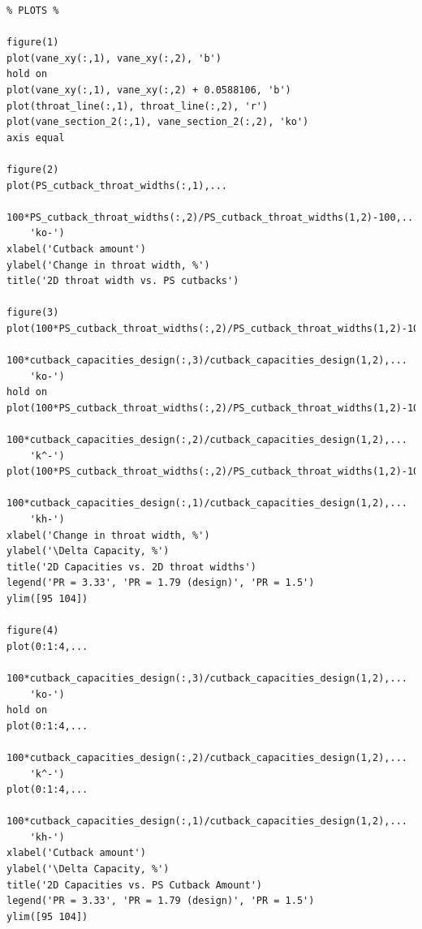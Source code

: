 \documentclass[a4paper, 11pt, oneside]{report}
\begin{document}
\begin{verbatim}
% PLOTS %

figure(1)
plot(vane_xy(:,1), vane_xy(:,2), 'b')
hold on
plot(vane_xy(:,1), vane_xy(:,2) + 0.0588106, 'b')
plot(throat_line(:,1), throat_line(:,2), 'r')
plot(vane_section_2(:,1), vane_section_2(:,2), 'ko')
axis equal

figure(2)
plot(PS_cutback_throat_widths(:,1),...
    100*PS_cutback_throat_widths(:,2)/PS_cutback_throat_widths(1,2)-100,...
    'ko-')
xlabel('Cutback amount')
ylabel('Change in throat width, %')
title('2D throat width vs. PS cutbacks')

figure(3)
plot(100*PS_cutback_throat_widths(:,2)/PS_cutback_throat_widths(1,2)-100,...
    100*cutback_capacities_design(:,3)/cutback_capacities_design(1,2),...
    'ko-')
hold on
plot(100*PS_cutback_throat_widths(:,2)/PS_cutback_throat_widths(1,2)-100,...
    100*cutback_capacities_design(:,2)/cutback_capacities_design(1,2),...
    'k^-')
plot(100*PS_cutback_throat_widths(:,2)/PS_cutback_throat_widths(1,2)-100,...
    100*cutback_capacities_design(:,1)/cutback_capacities_design(1,2),...
    'kh-')
xlabel('Change in throat width, %')
ylabel('\Delta Capacity, %')
title('2D Capacities vs. 2D throat widths')
legend('PR = 3.33', 'PR = 1.79 (design)', 'PR = 1.5')
ylim([95 104])

figure(4)
plot(0:1:4,...
    100*cutback_capacities_design(:,3)/cutback_capacities_design(1,2),...
    'ko-')
hold on
plot(0:1:4,...
    100*cutback_capacities_design(:,2)/cutback_capacities_design(1,2),...
    'k^-')
plot(0:1:4,...
    100*cutback_capacities_design(:,1)/cutback_capacities_design(1,2),...
    'kh-')
xlabel('Cutback amount')
ylabel('\Delta Capacity, %')
title('2D Capacities vs. PS Cutback Amount')
legend('PR = 3.33', 'PR = 1.79 (design)', 'PR = 1.5')
ylim([95 104])
\end{verbatim}
\end{document}
